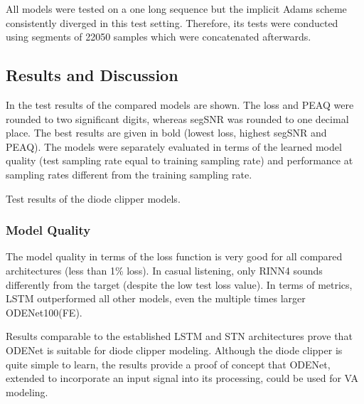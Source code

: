 All models were tested on a one long sequence but the implicit Adams scheme consistently diverged in this test setting. Therefore, its tests were conducted using segments of 22050 samples which were concatenated afterwards.

\subsection{Results and Discussion}
\label{sec:diode_clipper_results}

In  the test results of the compared models are shown. The loss and \ac{PEAQ} were rounded to two significant digits, whereas \ac{segSNR} was rounded to one decimal place. The best results are given in bold (lowest loss, highest \ac{segSNR} and \ac{PEAQ}). The models were separately evaluated in terms of the learned model quality (test sampling rate equal to training sampling rate) and performance at sampling rates different from the training sampling rate. 

\begin{table}[]
    \caption{Test results of the diode clipper models.}
    
    \label{tab:diode_clipper_results}
\end{table}

\subsubsection{Model Quality}

The model quality in terms of the loss function is very good for all compared architectures (less than 1\% loss). In casual listening, only \ac{RINN}4 sounds differently from the target (despite the low test loss value). In terms of metrics, \ac{LSTM} outperformed all other models, even the multiple times larger ODENet100(FE).

Results comparable to the established \ac{LSTM} and \ac{STN} architectures prove that ODENet is suitable for diode clipper modeling. Although the diode clipper is quite simple to learn, the results provide a proof of concept that ODENet, extended to incorporate an input signal into its processing, could be used for \ac{VA} modeling.

